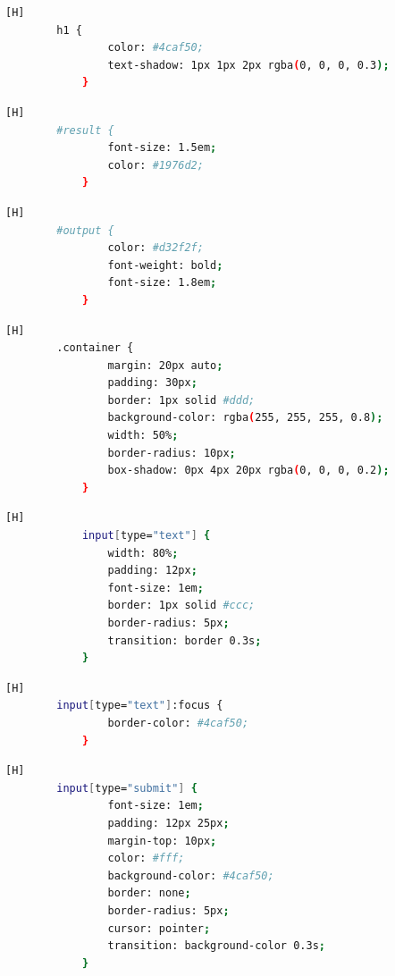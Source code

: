 \documentclass{article}
\begin{document}
	\begin{lstlisting}[language=bash,caption={Este estilo ayuda a que el encabezado sea más visualmente atractivo y legible.}][H]
		h1 {
                color: #4caf50;
                text-shadow: 1px 1px 2px rgba(0, 0, 0, 0.3);
            }
	\end{lstlisting}
	\begin{lstlisting}[language=bash,caption={Establece el tamaño de la fuente y define el color del texto.}][H]
		#result {
                font-size: 1.5em;
                color: #1976d2;
            }

	\end{lstlisting}
	\begin{lstlisting}[language=bash,caption={Establece el color del texto en un rojo intenso, hace que el texto sea negrita y aumenta el tamaño de la fuente}][H]
		#output {
                color: #d32f2f;
                font-weight: bold;
                font-size: 1.8em;
            }

	\end{lstlisting}
	
	\begin{lstlisting}[language=bash,caption={Le da un estilo al contenedor principal}][H]
		.container {
                margin: 20px auto;
                padding: 30px;
                border: 1px solid #ddd;
                background-color: rgba(255, 255, 255, 0.8);
                width: 50%;
                border-radius: 10px;
                box-shadow: 0px 4px 20px rgba(0, 0, 0, 0.2);
            }
	\end{lstlisting}
	
	\begin{lstlisting}[language=bash,caption={Este estilo hace que los campos de entrada de texto sean funcionales y atractivos.}][H]
            input[type="text"] {
                width: 80%;
                padding: 12px;
                font-size: 1em;
                border: 1px solid #ccc;
                border-radius: 5px;
                transition: border 0.3s;
            }
	\end{lstlisting}
	    
	\begin{lstlisting}[language=bash,caption={Da un estilo al campo de texto cuando lo selecciona, el borde cambia a un color verde vibrante.}][H]
		input[type="text"]:focus {
                border-color: #4caf50;
            }
	\end{lstlisting}
	\begin{lstlisting}[language=bash,caption={Le dara un estilo al botón de envío}][H]
		input[type="submit"] {
                font-size: 1em;
                padding: 12px 25px;
                margin-top: 10px;
                color: #fff;
                background-color: #4caf50;
                border: none;
                border-radius: 5px;
                cursor: pointer;
                transition: background-color 0.3s;
            }
	\end{lstlisting}
\end{document}
